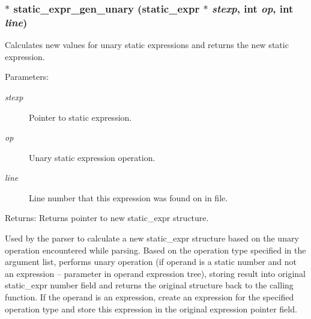\subsubsection{$\ast$ static\_\-expr\_\-gen\_\-unary ({\bf static\_\-expr} $\ast$ {\em stexp}, int {\em op}, int {\em line})}\label{static_8c_a0}


Calculates new values for unary static expressions and returns the new static expression.

\begin{Desc}
\item[Parameters:]
\begin{description}
\item[{\em stexp}]Pointer to static expression. \item[{\em op}]Unary static expression operation. \item[{\em line}]Line number that this expression was found on in file.\end{description}
\end{Desc}
\begin{Desc}
\item[Returns:]Returns pointer to new static\_\-expr structure.\end{Desc}
Used by the parser to calculate a new static\_\-expr structure based on the unary operation encountered while parsing. Based on the operation type specified in the argument list, performs unary operation (if operand is a static number and not an expression -- parameter in operand expression tree), storing result into original static\_\-expr number field and returns the original structure back to the calling function. If the operand is an expression, create an expression for the specified operation type and store this expression in the original expression pointer field. 